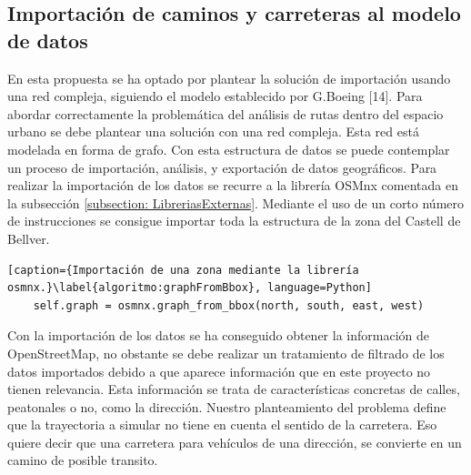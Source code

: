 \subsection{Importación de caminos y carreteras al modelo de datos}
\label{section: EstructuraLogica}
En esta propuesta se ha optado por plantear la solución de importación usando una red compleja, siguiendo el modelo establecido por G.Boeing [14]. Para abordar correctamente la 
problemática del análisis de rutas dentro del espacio urbano se debe plantear una solución con 
una red compleja. 
Esta red está modelada en forma de grafo. Con esta estructura de datos se puede contemplar un 
proceso de importación, análisis, y exportación de datos geográficos. Para realizar la importación 
de los datos se recurre a la librería OSMnx comentada en la subsección \ref{subsection: 
LibreriasExternas}. Mediante el uso de un corto número de instrucciones se consigue importar 
toda la estructura de la zona del Castell de Bellver.
\begin{lstlisting}[caption={Importación de una zona mediante la librería osmnx.}\label{algoritmo:graphFromBbox}, language=Python] 
	self.graph = osmnx.graph_from_bbox(north, south, east, west)
\end{lstlisting}


Con la importación de los datos se ha conseguido obtener la información de OpenStreetMap, 
no obstante se debe realizar un tratamiento de filtrado de los datos importados debido a que 
aparece información que en este proyecto no tienen relevancia. Esta información se trata de 
características concretas de calles, peatonales o no, como la dirección. Nuestro planteamiento del 
problema define que la trayectoria a simular no tiene en cuenta el sentido de la carretera. Eso 
quiere decir que una carretera para vehículos de una dirección, se convierte en un camino de 
posible transito. 

